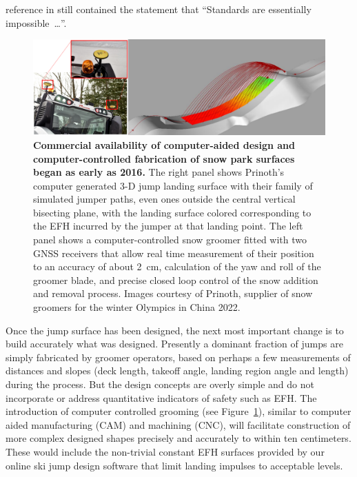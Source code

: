 \documentclass[fleqn,10pt,lineno]{wlpeerj}
\begin{document}
reference in \cite{NSAA2015} still contained the statement that ``Standards are
essentially impossible~\ldots''.
%
\begin{figure}
  \centering
  \includegraphics[width=\columnwidth]{figures/prinoth.png}
  \caption{\textbf{Commercial availability of computer-aided design and
    computer-controlled fabrication of snow park surfaces began as early as
    2016.} The right panel shows Prinoth's computer generated 3-D jump landing
    surface with their family of simulated jumper paths, even ones outside the
    central vertical bisecting plane, with the landing surface colored
    corresponding to the EFH incurred by the jumper at that landing point. The
    left panel shows a computer-controlled snow groomer fitted with two GNSS
    receivers that allow real time measurement of their position to an accuracy
    of about 2~\si{\centi\meter}, calculation of the yaw and roll of the
    groomer blade, and precise closed loop control of the snow addition and
    removal process.  Images courtesy of Prinoth, supplier of snow groomers for
  the winter Olympics in China 2022.}
  \label{fig:prinoth}
\end{figure}

Once the jump surface has been designed, the next most important change is to
build accurately what was designed. Presently a dominant fraction of jumps are
simply fabricated by groomer operators, based on perhaps a few measurements of
distances and slopes (deck length, takeoff angle, landing region angle and
length) during the process. But the design concepts are overly simple and do
not incorporate or address quantitative indicators of safety such as EFH. The
introduction of computer controlled grooming (see Figure~\ref{fig:prinoth}),
similar to computer aided manufacturing (CAM) and machining (CNC), will
facilitate construction of more complex designed shapes precisely and
accurately to within ten centimeters. These would include the non-trivial
constant EFH surfaces provided by our online ski jump design software that
limit landing impulses to acceptable levels.
\end{document}
